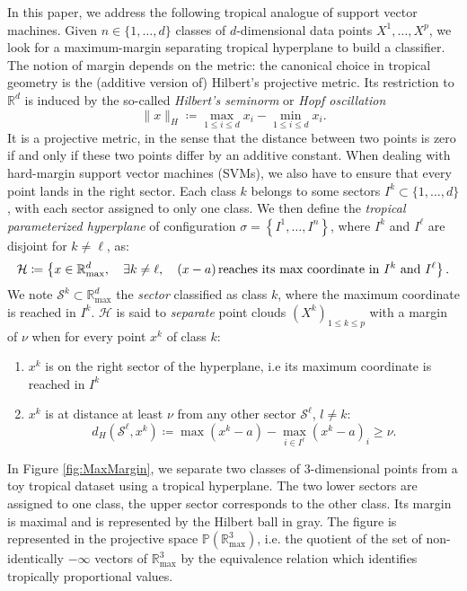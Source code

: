 \documentclass[oneside,UKenglish,a4paper]{amsart}
\numberwithin{equation}{section}
\numberwithin{figure}{section}
\theoremstyle{plain}
\theoremstyle{definition}
\theoremstyle{plain}
\theoremstyle{remark}
\theoremstyle{plain}
\theoremstyle{definition}
\theoremstyle{definition}
\begin{document}
In this paper, we address the following tropical analogue of support
vector machines. Given $n\in\{1,\ldots, d\}$ classes of $d$-dimensional data
points $X^{1},\ldots,X^{p}$, we look for a maximum-margin separating
tropical hyperplane to build a classifier. The notion of margin depends
on the metric: the canonical choice in tropical geometry is the (additive
version of) Hilbert's projective metric. Its restriction to $\mathbb{R}^{d}$
is induced by the so-called \emph{Hilbert's seminorm} or \emph{Hopf
oscillation}
\[
\lVert x\rVert_{H}\coloneqq\max_{1\le i\le d}x_{i}-\min_{1\le i\le d}x_{i}.
\]
It is a projective metric, in the sense that the distance between
two points is zero if and only if these two points differ by an additive
constant. When dealing with hard-margin support vector machines (SVMs),
we also have to ensure that every point lands in the right sector. Each class $k$ belongs to some sectors $I^k\subset \{1,\ldots, d\}$, with each sector assigned to only one class. We then define the \emph{tropical parameterized hyperplane} of configuration
$\sigma=\left\{I^{1},\ldots,I^{n}\right\}$, where $I^{k}$ and $I^{\ell}$
are disjoint for $k\ne\ell$, as:
\[
\mathcal{H}\coloneqq\left\{x\in\mathbb{R}_{\max}^{d},\quad\exists k\ne\ell,\quad (x-a)\,\text{reaches its max coordinate in \ensuremath{I^{k}} and \ensuremath{I^{\ell}}}\right\}.
\]
We note $\mathcal{S}^k\subset \mathbb{R}_{\max}^d$ the \emph{sector} classified as class $k$, where the maximum coordinate is reached in $I^k$. $\mathcal{H}$ is said to \emph{separate} point
clouds $(X^{k})_{1\le k\le p}$ with a margin of $\nu$ when for every point
$x^{k}$ of class $k$:
\begin{enumerate}
\item $x^{k}$ is on the right sector of the hyperplane, i.e its maximum
coordinate is reached in $I^{k}$
\item $x^{k}$ is at distance at least $\nu$ from any other sector $\mathcal{S}^\ell$, $l \ne k$: %
\begin{equation*}
d_H(\mathcal{S}^\ell,x^{k})\coloneqq\max(x^{k}-a)-\max_{i\in I^\ell}(x^{k}-a)_i\ge\nu.
\end{equation*}
\end{enumerate}


In Figure \ref{fig:MaxMargin}, we separate two classes
of $3$-dimensional points from a toy tropical dataset using a tropical
hyperplane. The two lower sectors are assigned to one class, the upper sector corresponds to the other class. Its margin is maximal and is represented by the Hilbert
ball in gray. The figure is represented in the projective space $\mathbb{P}\left(\mathbb{R}_{\text{max}}^{3}\right)$,
i.e. the quotient of the set of non-identically $-\infty$ vectors
of $\mathbb{R}_{\text{max}}^{3}$ by the equivalence relation which
identifies tropically proportional values.
\end{document}
